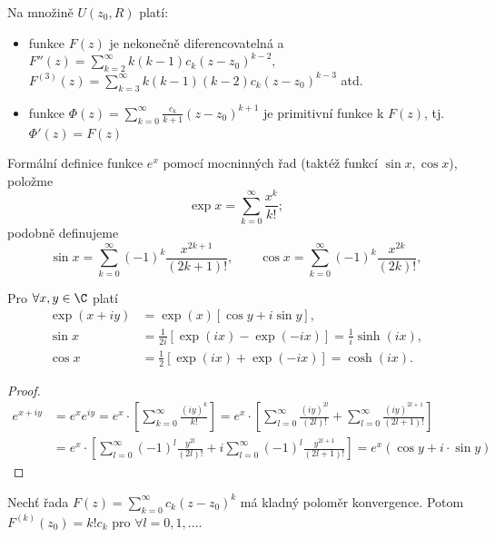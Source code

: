 \begin{dusledek}
  Na množině $U(z_0, R)$ platí:
\begin{itemize}
    \item funkce $F(z)$ je nekonečně diferencovatelná a $F''(z) = \sum_{k=2}^{\infty} k(k-1)c_k(z - z_0)^{k-2}$, $F^{(3)}(z) = \sum_{k=3}^{\infty} k(k-1)(k-2)c_k(z - z_0)^{k-3}$ atd.
    \item funkce $\Phi(z) = \sum_{k=0}^{\infty} \frac{c_k}{k+1}(z - z_0)^{k+1}$ je primitivní funkce k $F(z)$, tj. $\Phi'(z) = F(z)$
\end{itemize}
\end{dusledek}

\begin{poznamka}
  Formální definice funkce $e^x$ pomocí mocninných řad (taktéž funkcí $\sin x, \cos x$), položme
  \[
\exp x = \sum_{k=0}^{\infty} \frac{x^k}{k!};
\]
podobně definujeme
\[
\sin x = \sum_{k=0}^{\infty} (-1)^k \frac{x^{2k+1}}{(2k+1)!}, \qquad \cos x = \sum_{k=0}^{\infty} (-1)^k \frac{x^{2k}}{(2k)!},
\]
\end{poznamka}

\begin{lemma}
  Pro $\forall x, y \in \C$ platí
\[
\begin{aligned}
\exp(x + iy) &= \exp(x) \left[ \cos y + i \sin y \right], \\
\sin x &= \frac{1}{2i} \left[ \exp(ix) - \exp(-ix) \right] = \frac{1}{i} \sinh(ix), \\
\cos x &= \frac{1}{2} \left[ \exp(ix) + \exp(-ix) \right] = \cosh(ix).
\end{aligned}
\]
\end{lemma}

\begin{proof}
  \begin{align*}
  e^{x+iy}&=e^xe^{iy}= e^x\cdot\left[\sum_{k=0}^\infty \frac{(iy)^k}{k!}\right] = e^x\cdot\left[\sum_{l=0}^\infty \frac{(iy)^{2l}}{(2l)!} + \sum_{l=0}^\infty \frac{(iy)^{2l+1}}{(2l+1)!} \right]\\
  &= e^x\cdot\left[\sum_{l=0}^\infty (-1)^l\frac{y^{2l}}{(2l)!}+i\sum_{l=0}^\infty (-1)^l\frac{y^{2l+1}}{(2l+1)!}\right]=e^x\left(\cos y+i\cdot\sin y\right)
  \end{align*}
\end{proof}

\begin{veta}
  Nechť řada $F(z) = \sum_{k=0}^{\infty} c_k (z - z_0)^k$ má kladný poloměr konvergence. Potom $F^{(k)}(z_0) = k! c_k$ pro $\forall l = 0, 1, \dots$.
\end{veta}

